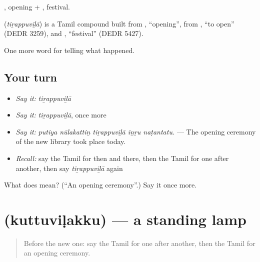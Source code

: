 , opening + , festival.

\begin{cousinweb}
\textbf{} (\emph{tiṟappuviḻā}) is a Tamil compound built from , \textquotedblleft{}opening\textquotedblright{}, from , \textquotedblleft{}to open\textquotedblright{} (DEDR 3259), and , \textquotedblleft{}festival\textquotedblright{} (DEDR 5427).
\end{cousinweb}

\begin{grammarlens}[title={What you've built}]
One more word for telling what happened.
\end{grammarlens}

\subsection*{Your turn}
\begin{itemize}
\raggedright
  \item \emph{Say it:} \emph{tiṟappuviḻā}
  \item \emph{Say it:} \emph{tiṟappuviḻā}, once more
  \item \emph{Say it:} \emph{putiya nūlakattiṉ tiṟappuviḻā iṉṟu naṭantatu.} — The opening ceremony of the new library took place today.
  \item \emph{Recall:} say the Tamil for then and there, then the Tamil for one after another, then say \emph{tiṟappuviḻā} again
\end{itemize}

\begin{tcolorbox}[breakable,colback=teal!4,colframe=teal!35!black,title={Before you move on}]
What does  mean? (\textquotedblleft{}An opening ceremony\textquotedblright{}.) Say it once more.
\end{tcolorbox}
\section[\texorpdfstring{\ta{குத்துவிளக்கு} (kuttuviḷakku)}{குத்துவிளக்கு (kuttuviḷakku)}]{ (kuttuviḷakku) — a standing lamp}

\label{lesson:TA-C318-kuttuvilakku}



\begin{quote}
Before the new one: say the Tamil for one after another, then the Tamil for an opening ceremony.
\end{quote}

